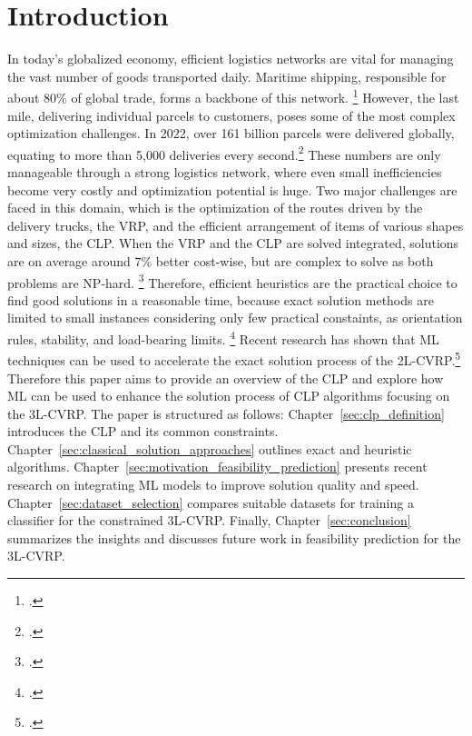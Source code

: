 \chapter{Introduction}
\label{sec:introduction}
In today’s globalized economy, efficient logistics networks are vital for managing the vast number of
goods transported daily. Maritime shipping, responsible for about $80\%$ of global trade,
forms a backbone of this network. \footcite[cf.][]{un_trade_and_development_unctad_review_2024}
However, the last mile, delivering individual parcels to customers, poses some of the most complex optimization
challenges. In 2022, over 161 billion parcels were delivered globally, equating to more than 5,000
deliveries every second.\footcite[cf.][]{statista_global_2022}
These numbers are only manageable through a strong logistics network, where even small inefficiencies
become very costly and optimization potential is huge. Two major challenges are faced in this domain, which
is the optimization of the routes driven by the delivery trucks, the \gls{VRP}, and the efficient arrangement of items
of various shapes and sizes, the \gls{CLP}. When the \gls{VRP} and the \gls{CLP} are solved integrated,
solutions are on average around $7\%$ better cost-wise, but are complex to solve as
both problems are NP-hard. \footcite[cf.][p. 23]{cote_value_2016} Therefore, efficient heuristics are the practical
choice to find good solutions in a reasonable time, because exact solution methods are limited to
small instances considering only few practical constaints, as orientation rules, stability, and load-bearing limits. \footcite[cf.][pp. 377--378]{bischoff_issues_1995}
Recent research has shown that \gls{ML} techniques can be used to accelerate the exact solution process
of the \gls{2L-CVRP}.\footcite[cf.][]{zhang_learning-based_2022}
Therefore this paper aims to provide an overview of the \gls{CLP} and explore how \gls{ML} can be used
to enhance the solution process of \gls{CLP} algorithms focusing on the \gls{3L-CVRP}.
The paper is structured as follows:
Chapter~\ref{sec:clp_definition} introduces the \gls{CLP} and its common constraints.
Chapter~\ref{sec:classical_solution_approaches} outlines exact and heuristic algorithms.
Chapter~\ref{sec:motivation_feasibility_prediction} presents recent research on integrating \gls{ML}
models to improve solution quality and speed. Chapter~\ref{sec:dataset_selection} compares suitable datasets
for training a classifier for the constrained \gls{3L-CVRP}. Finally, Chapter~\ref{sec:conclusion}
summarizes the insights and discusses future work in feasibility prediction for the \gls{3L-CVRP}.
